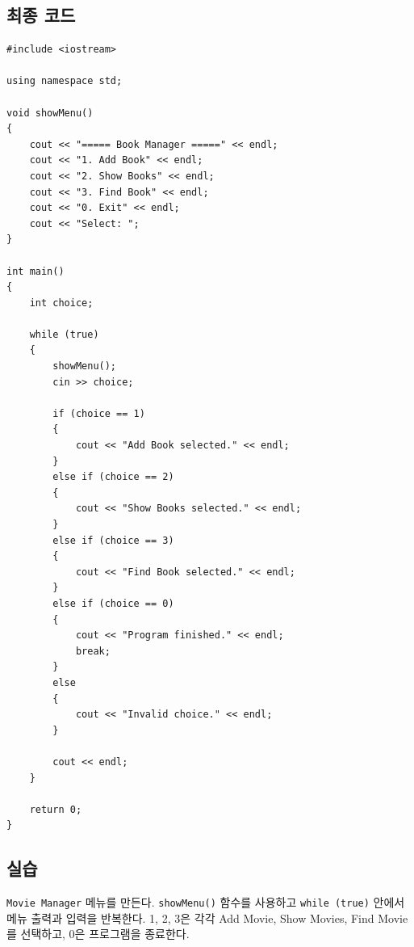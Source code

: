 \documentclass[11pt,a4paper]{article}
\begin{document}
\subsection{최종 코드}
\begin{lstlisting}
#include <iostream>

using namespace std;

void showMenu()
{
    cout << "===== Book Manager =====" << endl;
    cout << "1. Add Book" << endl;
    cout << "2. Show Books" << endl;
    cout << "3. Find Book" << endl;
    cout << "0. Exit" << endl;
    cout << "Select: ";
}

int main()
{
    int choice;

    while (true)
    {
        showMenu();
        cin >> choice;

        if (choice == 1)
        {
            cout << "Add Book selected." << endl;
        }
        else if (choice == 2)
        {
            cout << "Show Books selected." << endl;
        }
        else if (choice == 3)
        {
            cout << "Find Book selected." << endl;
        }
        else if (choice == 0)
        {
            cout << "Program finished." << endl;
            break;
        }
        else
        {
            cout << "Invalid choice." << endl;
        }

        cout << endl;
    }

    return 0;
}
\end{lstlisting}

\subsection{실습}
\begin{practicebox}
\texttt{Movie Manager} 메뉴를 만든다.
\texttt{showMenu()} 함수를 사용하고 \texttt{while (true)} 안에서 메뉴 출력과 입력을 반복한다.
1, 2, 3은 각각 Add Movie, Show Movies, Find Movie를 선택하고, 0은 프로그램을 종료한다.
\end{practicebox}
\end{document}
